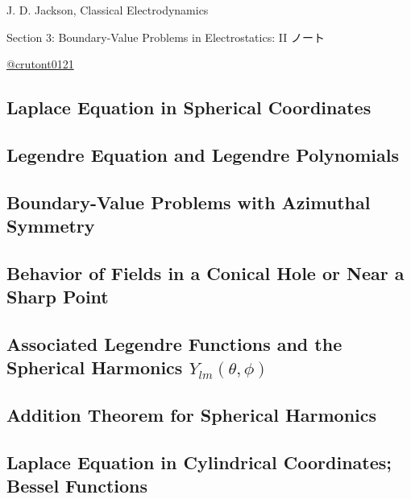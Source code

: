 
\pagestyle{fancy}  
\fancyhead[L]{\textsc{\rightmark}}
\fancyhead[C]{}  
\fancyhead[R]{\textbf{\thepage}}  
\fancyfoot{}
\renewcommand{\headrulewidth}{0.1pt}
\renewcommand{\contentsname}{Contents}

  
\begin{screen}
  \centering
  J. D. Jackson, Classical Electrodynamics

  Section 3: Boundary-Value Problems in Electrostatics: II ノート
\end{screen}
\begin{flushright}  
\href{https://github.com/crutont0121}{@crutont0121}
\end{flushright}

\setcounter{section}{3}
\tableofcontents
\hrulefill
\clearpage

\subsection{Laplace Equation in Spherical Coordinates}

\subsection{Legendre Equation and Legendre Polynomials}

\subsection{Boundary-Value Problems with Azimuthal Symmetry}

\subsection{Behavior of Fields in a Conical Hole or Near a Sharp Point}

\subsection{Associated Legendre Functions and the Spherical Harmonics \texorpdfstring{$Y_{lm}(\theta, \phi)$}{}}

\subsection{Addition Theorem for Spherical Harmonics}

\subsection{Laplace Equation in Cylindrical Coordinates; Bessel Functions}

